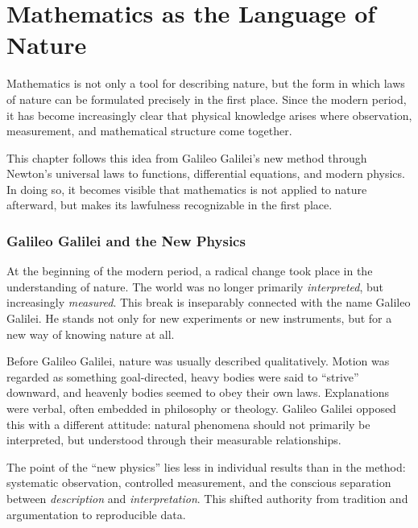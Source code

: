 \chapter{Mathematics as the Language of Nature}
\label{chap:IV_language}

Mathematics is not only a tool for describing nature,
but the form in which laws of nature can be formulated precisely in the first place.
Since the modern period, it has become increasingly clear
that physical knowledge arises where observation, measurement,
and mathematical structure come together.

This chapter follows this idea
from Galileo Galilei's new method
through Newton's universal laws
to functions, differential equations,
and modern physics.
In doing so, it becomes visible
that mathematics is not applied to nature afterward,
but makes its lawfulness recognizable in the first place.

\subsection{Galileo Galilei and the New Physics}

At the beginning of the modern period,
a radical change took place in the understanding of nature.
The world was no longer primarily \emph{interpreted},
but increasingly \emph{measured}.
This break is inseparably connected with the name
Galileo Galilei.
He stands not only for new experiments or new instruments,
but for a new way of knowing nature at all.

Before Galileo Galilei, nature was usually described qualitatively.
Motion was regarded as something goal-directed,
heavy bodies were said to ``strive'' downward,
and heavenly bodies seemed to obey their own laws.
Explanations were verbal, often embedded in philosophy or theology.
Galileo Galilei opposed this with a different attitude:
natural phenomena should not primarily be interpreted,
but understood through their measurable relationships.

\begin{HistoryBox}
	\label{box:measurement}
	The point of the ``new physics'' lies less in individual results
	than in the method:
	systematic observation, controlled measurement,
	and the conscious separation between \emph{description} and \emph{interpretation}.
	This shifted authority
	from tradition and argumentation
	to reproducible data.
\end{HistoryBox}

